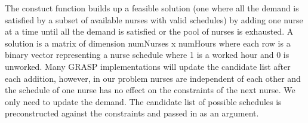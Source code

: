 \documentclass[11pt]{article}
\begin{document}

The constuct function builds up a feasible solution (one where all the demand is satisfied by a subset of available nurses with valid schedules) by
adding one nurse at a time until all the demand is satisfied or the pool of nurses is exhausted.
A solution is a matrix of dimension numNurses x numHours where each row is a binary vector representing a nurse schedule where 1 is a worked hour and 0 is unworked.
Many GRASP implementations will update the candidate list after each addition, however, in our problem nurses are independent of each other and
the schedule of one nurse has no effect on the constraints of the next nurse. We only need to update the demand. The candidate list of possible schedules is preconstructed against the constraints
and passed in as an argument.\\
\end{document}
